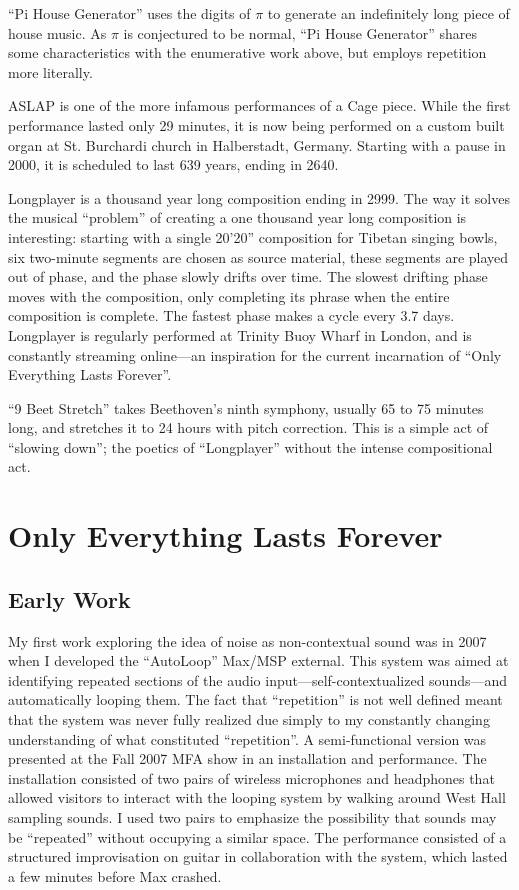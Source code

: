 \documentclass{thesis}
\begin{document}
``Pi House Generator'' uses the digits of $\pi$ to generate an indefinitely long piece of house music. As $\pi$ is conjectured to be normal, ``Pi House Generator'' shares some characteristics with the enumerative work above, but employs repetition more literally.

ASLAP is one of the more infamous performances of a Cage piece. While the first performance lasted only 29 minutes, it is now being performed on a custom built organ at St. Burchardi church in Halberstadt, Germany. Starting with a pause in 2000, it is scheduled to last 639 years, ending in 2640.
	
Longplayer is a thousand year long composition ending in 2999. The way it solves the musical ``problem'' of creating a one thousand year long composition is interesting: starting with a single 20'20'' composition for Tibetan singing bowls, six two-minute segments are chosen as source material, these segments are played out of phase, and the phase slowly drifts over time. The slowest drifting phase moves with the composition, only completing its phrase when the entire composition is complete. The fastest phase makes a cycle every 3.7 days. Longplayer is regularly performed at Trinity Buoy Wharf in London, and is constantly streaming online---an inspiration for the current incarnation of ``Only Everything Lasts Forever''.

``9 Beet Stretch'' takes Beethoven's ninth symphony, usually 65 to 75 minutes long, and stretches it to 24 hours with pitch correction. This is a simple act of ``slowing down''; the poetics of ``Longplayer'' without the intense compositional act.
				
\chapter{Only Everything Lasts Forever}

\section{Early Work}

My first work exploring the idea of noise as non-contextual sound was in 2007 when I developed the ``AutoLoop'' Max/MSP external. This system was aimed at identifying repeated sections of the audio input---self-contextualized sounds---and automatically looping them. The fact that ``repetition'' is not well defined meant that the system was never fully realized due simply to my constantly changing understanding of what constituted ``repetition''. A semi-functional version was presented at the Fall 2007 MFA show in an installation and performance. The installation consisted of two pairs of wireless microphones and headphones that allowed visitors to interact with the looping system by walking around West Hall sampling sounds. I used two pairs to emphasize the possibility that sounds may be ``repeated'' without occupying a similar space. The performance consisted of a structured improvisation on guitar in collaboration with the system, which lasted a few minutes before Max crashed.
\end{document}
